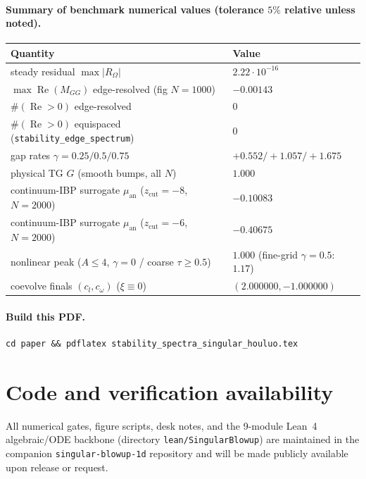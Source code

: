 \documentclass[11pt,a4paper]{article}
\begin{document}
\paragraph{Summary of benchmark numerical values (tolerance $5\%$ relative unless noted).}
\begin{center}
\begin{tabular}{@{}ll@{}}
\toprule
Quantity & Value \\
\midrule
steady residual $\max|R_\Omega|$ & $2.22\cdot 10^{-16}$ \\
$\max\operatorname{Re}(M_{GG})$ edge-resolved (fig $N=1000$) & $-0.00143$ \\
$\#(\operatorname{Re}>0)$ edge-resolved & $0$ \\
$\#(\operatorname{Re}>0)$ equispaced (\texttt{stability\_edge\_spectrum}) & $0$ \\
gap rates $\gamma=0.25/0.5/0.75$ & $+0.552/+1.057/+1.675$ \\
physical TG $G$ (smooth bumps, all $N$) & $1.000$ \\
continuum-IBP surrogate $\mu_{\mathrm{an}}$ ($z_{\mathrm{cut}}=-8$, $N=2000$) & $-0.10083$ \\
continuum-IBP surrogate $\mu_{\mathrm{an}}$ ($z_{\mathrm{cut}}=-6$, $N=2000$) & $-0.40675$ \\
nonlinear peak ($A\le 4$, $\gamma=0$ / coarse $\tau\ge 0.5$) & $1.000$ (fine-grid $\gamma=0.5$: $1.17$) \\
coevolve finals $(c_l,c_\omega)$ ($\xi\equiv 0$) & $(2.000000,-1.000000)$ \\
\bottomrule
\end{tabular}
\end{center}

\paragraph{Build this PDF.}
{\small
\begin{verbatim}
cd paper && pdflatex stability_spectra_singular_houluo.tex
\end{verbatim}
}

\section*{Code and verification availability}
All numerical gates, figure scripts, desk notes, and the 9-module Lean~4 algebraic/ODE
backbone (directory \texttt{lean/SingularBlowup}) are maintained in the companion
\texttt{singular-blowup-1d} repository and will be made publicly available upon release or
request.
\end{document}
